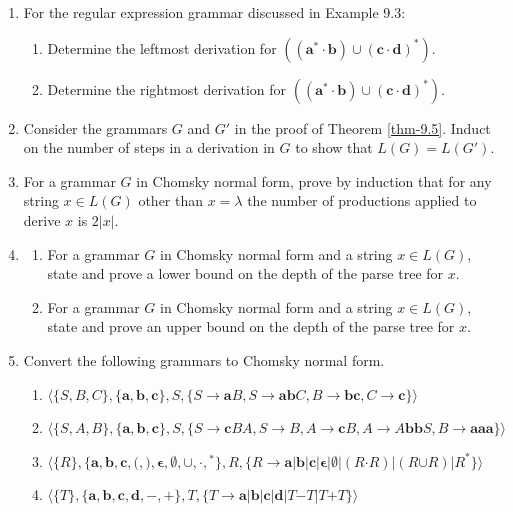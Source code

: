 \begin{enumerate}[{9.}1.]
\item For the regular expression grammar discussed in Example 9.3:
\begin{enumerate}
\item Determine the leftmost derivation for $\pmb{((a^*\cdot b)\cup(c\cdot d)^*)}$.
\item Determine the rightmost derivation for $\pmb{((a^*\cdot b)\cup(c\cdot d)^*)}$.
\end{enumerate}

\item Consider the grammars $G$ and $G'$ in the proof of Theorem \ref{thm-9.5}. Induct on
the number of steps in a derivation in $G$ to show that $L(G) = L(G')$.

\item For a grammar $G$ in Chomsky normal form, prove by induction that for any
string $x \in L(G)$ other than $x=\lambda$ the number of productions applied to
derive $x$ is $2|x|$.

\item \begin{enumerate}
\item For a grammar $G$ in Chomsky normal form and a string $x \in L(G)$, state
and prove a lower bound on the depth of the parse tree for $x$.
\item For a grammar $G$ in Chomsky normal form and a string $x \in L(G)$, state
and prove an upper bound on the depth of the parse tree for $x$.
\end{enumerate}

\item Convert the following grammars to Chomsky normal form.
\begin{enumerate}
\item $\langle\{S,B,C\},\{\pmb{a},\pmb{b},\pmb{c}\},S,\{S\rightarrow\pmb{a}B,S
\rightarrow\pmb{ab}C,B\rightarrow\pmb{bc},C\rightarrow\pmb{c}\}\rangle$
\item $\langle\{S,A,B\},\{\pmb{a},\pmb{b},\pmb{c}\},S,\{S\rightarrow\pmb{c}BA,S
\rightarrow B,A\rightarrow\pmb{c}B,A\rightarrow A\pmb{bb}S,B\rightarrow\pmb{aaa}
\}\rangle$
\item $\langle\{R\},\{\pmb{a},\pmb{b},\pmb{c},\pmb{(},\pmb{)},\pmb{\epsilon},
\pmb{\emptyset},\pmb{\cup},\pmb{\cdot},\pmb{^*}\},R,\{R\rightarrow\pmb{a}|\pmb{b}
|\pmb{c}|\pmb{\epsilon}|\pmb{\emptyset}|(R\pmb{\cdot}R)|(R\pmb{\cup}R)|R^{\pmb{*}
}\}\rangle$
\item $\langle\{T\},\{\pmb{a},\pmb{b},\pmb{c},\pmb{d},\pmb{-},\pmb{+}\},T,\{T
\rightarrow\pmb{a}|\pmb{b}|\pmb{c}|\pmb{d}|T\pmb{-}T|T\pmb{+}T\}\rangle$
\end{enumerate}


\end{enumerate}
